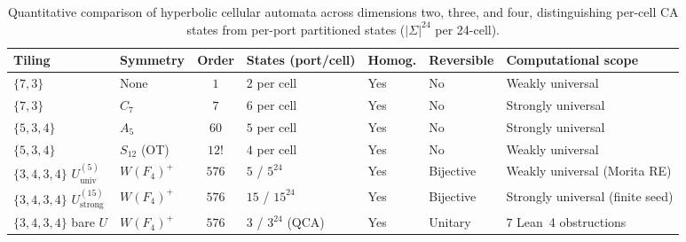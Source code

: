 \begin{table}[tb]
\centering
\caption{Quantitative comparison of hyperbolic cellular automata across dimensions two, three, and four, distinguishing per-cell CA states from per-port partitioned states ($|\Sigma|^{24}$ per 24-cell).}
\label{tab:symmetry-frontier}
\footnotesize
\setlength{\tabcolsep}{4pt}
\begin{tabularx}{\textwidth}{@{}llclllX@{}}
\toprule
Tiling & Symmetry & Order & States (port/cell) & Homog. & Reversible & Computational scope \\
\midrule
$\{7,3\}$~\cite{margenstern2018two} & None & $1$ & $2$ per cell & Yes & No & Weakly universal \\
$\{7,3\}$~\cite{margenstern2024heptagrid} & $C_7$ & $7$ & $6$ per cell & Yes & No & Strongly universal \\
$\{5,3,4\}$~\cite{margenstern2021dodecagrid} & $A_5$ & $60$ & $5$ per cell & Yes & No & Strongly universal \\
$\{5,3,4\}$~\cite{margenstern2021outer} & $S_{12}$ (OT) & $12!$ & $4$ per cell & Yes & No & Weakly universal \\
$\{3,4,3,4\}$ $U_{\mathrm{univ}}^{(5)}$ & $W(F_4)^+$ & $576$ & $5$ / $5^{24}$ & Yes & Bijective & Weakly universal (Morita RE) \\
$\{3,4,3,4\}$ $U_{\mathrm{strong}}^{(15)}$ & $W(F_4)^+$ & $576$ & $15$ / $15^{24}$ & Yes & Bijective & Strongly universal (finite seed) \\
$\{3,4,3,4\}$ bare $U$ & $W(F_4)^+$ & $576$ & $3$ / $3^{24}$ (QCA) & Yes & Unitary & $7$ Lean~4 obstructions \\
\bottomrule
\end{tabularx}
\end{table}
